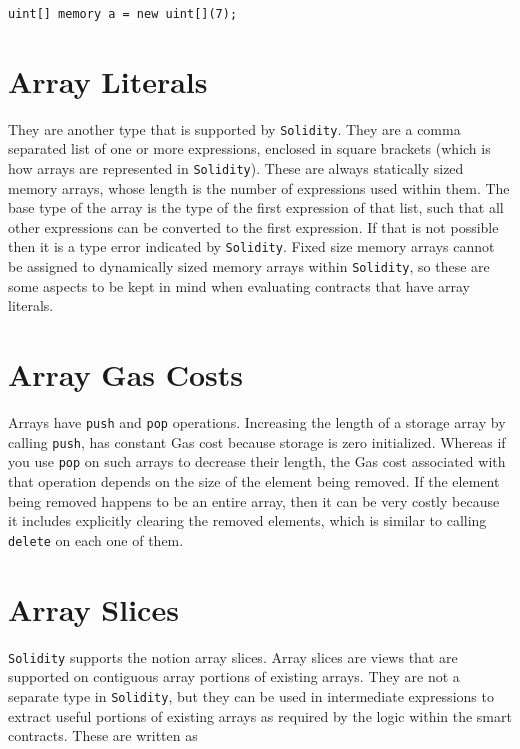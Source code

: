 \begin{lstlisting}[language=Solidity, style=solStyle, caption={Example of memory array definition.}]
uint[] memory a = new uint[](7);
\end{lstlisting}

\section{Array Literals}
They are another type that is supported by \texttt{Solidity}. They are a comma separated list of one or more expressions, enclosed in square brackets (which is how arrays are represented in \texttt{Solidity}). These are always statically sized memory arrays, whose length is the number of expressions used within them. The base type of the array is the type of the first expression of that list, such that all other expressions can be converted to the first expression. If that is not possible then it is a type error indicated by \texttt{Solidity}. Fixed size memory arrays cannot be assigned to dynamically sized memory arrays within \texttt{Solidity}, so these are some aspects to be kept in mind when evaluating contracts that have array literals.

\section{Array Gas Costs}
Arrays have \texttt{push} and \texttt{pop} operations. Increasing the length of a storage array by calling \texttt{push}, has constant Gas cost because storage is zero initialized. Whereas if you use \texttt{pop} on such arrays to decrease their length, the Gas cost associated with that operation depends on the size of the element being removed. If the element being removed happens to be an entire array, then it can be very costly because it includes explicitly clearing the removed elements, which is similar to calling \texttt{delete} on each one of them.

\section{Array Slices}
\texttt{Solidity} supports the notion array slices. Array slices are views that are supported on contiguous array portions of existing arrays. They are not a separate type in \texttt{Solidity}, but they can be used in intermediate expressions to extract useful portions of existing arrays as required by the logic within the smart contracts. These are written as

